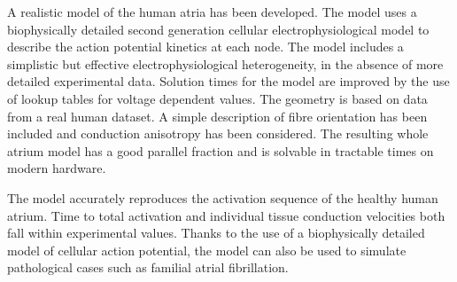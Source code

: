 A realistic model of the human atria has been developed.
The model uses a biophysically detailed second generation cellular
electrophysiological model to describe the action potential kinetics at each node.
The model includes a simplistic but effective electrophysiological
heterogeneity, in the absence of more detailed experimental data.
Solution times for the model are improved by the use of lookup tables for
voltage dependent values.
The geometry is based on data from a real human dataset.
A simple description of fibre orientation has been included and conduction
anisotropy has been considered.
The resulting whole atrium model has a good parallel fraction and is solvable in
tractable times on modern hardware.

The model accurately reproduces the activation sequence of the healthy human
atrium.
Time to total activation and individual tissue conduction velocities both fall
within experimental values.
Thanks to the use of a biophysically detailed model of cellular action
potential, the model can also be used to simulate pathological cases such as
familial atrial fibrillation.


